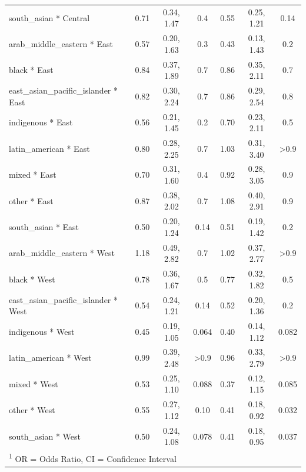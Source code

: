 \documentclass[
  letterpaper,
  DIV=11,
  numbers=noendperiod]{scrartcl}
\begin{document}
\begin{longtable}{lcccccc}
\hspace{1em}south\_asian * Central & 0.71 & 0.34, 1.47 & 0.4 & 0.55 & 0.25, 1.21 & 0.14\\
\hspace{1em}arab\_middle\_eastern * East & 0.57 & 0.20, 1.63 & 0.3 & 0.43 & 0.13, 1.43 & 0.2\\
\hspace{1em}black * East & 0.84 & 0.37, 1.89 & 0.7 & 0.86 & 0.35, 2.11 & 0.7\\
\hspace{1em}east\_asian\_pacific\_islander * East & 0.82 & 0.30, 2.24 & 0.7 & 0.86 & 0.29, 2.54 & 0.8\\
\hspace{1em}indigenous * East & 0.56 & 0.21, 1.45 & 0.2 & 0.70 & 0.23, 2.11 & 0.5\\
\hspace{1em}latin\_american * East & 0.80 & 0.28, 2.25 & 0.7 & 1.03 & 0.31, 3.40 & >0.9\\
\hspace{1em}mixed * East & 0.70 & 0.31, 1.60 & 0.4 & 0.92 & 0.28, 3.05 & 0.9\\
\hspace{1em}other * East & 0.87 & 0.38, 2.02 & 0.7 & 1.08 & 0.40, 2.91 & 0.9\\
\hspace{1em}south\_asian * East & 0.50 & 0.20, 1.24 & 0.14 & 0.51 & 0.19, 1.42 & 0.2\\
\hspace{1em}arab\_middle\_eastern * West & 1.18 & 0.49, 2.82 & 0.7 & 1.02 & 0.37, 2.77 & >0.9\\
\hspace{1em}black * West & 0.78 & 0.36, 1.67 & 0.5 & 0.77 & 0.32, 1.82 & 0.5\\
\hspace{1em}east\_asian\_pacific\_islander * West & 0.54 & 0.24, 1.21 & 0.14 & 0.52 & 0.20, 1.36 & 0.2\\
\hspace{1em}indigenous * West & 0.45 & 0.19, 1.05 & 0.064 & 0.40 & 0.14, 1.12 & 0.082\\
\hspace{1em}latin\_american * West & 0.99 & 0.39, 2.48 & >0.9 & 0.96 & 0.33, 2.79 & >0.9\\
\hspace{1em}mixed * West & 0.53 & 0.25, 1.10 & 0.088 & 0.37 & 0.12, 1.15 & 0.085\\
\hspace{1em}other * West & 0.55 & 0.27, 1.12 & 0.10 & 0.41 & 0.18, 0.92 & 0.032\\
\hspace{1em}south\_asian * West & 0.50 & 0.24, 1.08 & 0.078 & 0.41 & 0.18, 0.95 & 0.037\\*
\multicolumn{7}{l}{\rule{0pt}{1em}\textsuperscript{1} OR = Odds Ratio, CI = Confidence Interval}\\
\end{longtable}
\end{document}
